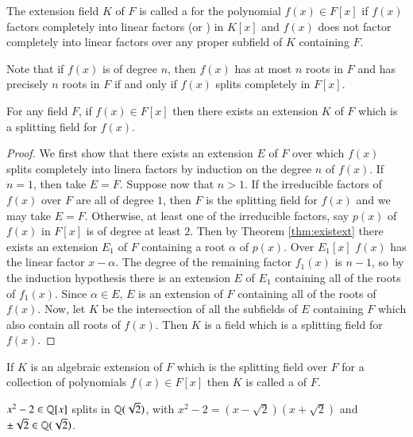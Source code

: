 \begin{definition}
    The extension field $K$ of $F$ is called a  for the polynomial $f(x) \in F[x]$ if $f(x)$ factors completely into linear factors (or ) in $K[x]$ and $f(x)$ does not factor completely into linear factors over any proper subfield of $K$ containing $F$.
\end{definition}

Note that if $f(x)$ is of degree $n$, then $f(x)$ has at most $n$ roots in $F$ and has precisely $n$ roots in $F$ if and only if $f(x)$ splits completely in $F[x]$.

\begin{theorem}
    For any field $F$, if $f(x) \in F[x]$ then there exists an extension $K$ of $F$ which is a splitting field for $f(x)$.
\end{theorem}
\begin{proof}
    We first show that there exists an extension $E$ of $F$ over which $f(x)$ splits completely into linera factors by induction on the degree $n$ of $f(x)$. If $n = 1$, then take $E = F$. Suppose now that $n > 1$. If the irreducible factors of $f(x)$ over $F$ are all of degree $1$, then $F$ is the splitting field for $f(x)$ and we may take $E= F$. Otherwise, at least one of the irreducible factors, say $p(x)$ of $f(x)$ in $F[x]$ is of degree at least $2$. Then by Theorem \ref{thm:existext} there exists an extension $E_1$ of $F$ containing a root $\alpha$ of $p(x)$. Over $E_1[x]$ $f(x)$ has the linear factor $x-\alpha$. The degree of the remaining factor $f_1(x)$ is $n-1$, so by the induction hypothesis there is an extension $E$ of $E_1$ containing all of the roots of $f_1(x)$. Since $\alpha \in E$, $E$ is an extension of $F$ containing all of the roots of $f(x)$. Now, let $K$ be the intersection of all the subfields of $E$ containing $F$ which also contain all roots of $f(x)$. Then $K$ is a field which is a splitting field for $f(x)$.
\end{proof}

\begin{definition}
    If $K$ is an algebraic extension of $F$ which is the splitting field over $F$ for a collection of polynomials $f(x) \in F[x]$ then $K$ is called a  of $F$.
\end{definition}

\begin{example}
    $x^2 - 2 \in \mathbb Q[x]$ splits in $\mathbb Q(\sqrt{2})$, with $x^2-2 = (x-\sqrt{2})(x+\sqrt{2})$ and $\pm\sqrt{2}\in \mathbb Q(\sqrt{2})$.
\end{example}


